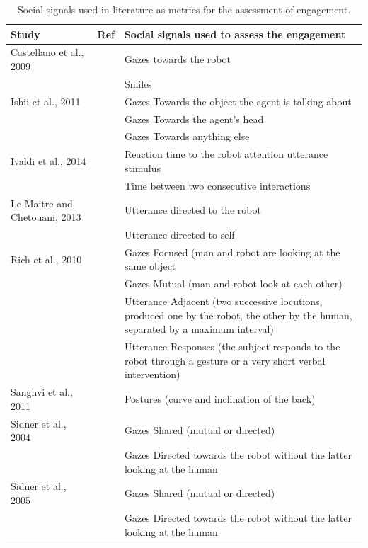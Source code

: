 \documentclass[twocolumn]{svjour3}          %
\begin{document}
\begin{table}
\centering
\begin{tabular}{|p{4.5cm}p{0.7cm}p{11cm}|}
\hline
Study & Ref & Social signals used to assess the engagement \\
\hline
\hline
Castellano et al., 2009 & \cite{Castellano2009} & Gazes towards the robot\\
 				& & Smiles\\
\hline
Ishii et al., 2011 & \cite{Iishi2011} &Gazes Towards the object the agent is talking about \\
			& &Gazes Towards the agent's head \\
			& &Gazes Towards anything else \\
\hline
Ivaldi et al., 2014 & \cite{ivaldi2014frontiers}  &Reaction time to the robot attention utterance stimulus \\
												& &Time between two consecutive interactions\\
\hline
Le Maitre and Chetouani, 2013 & \cite{Lemaitre2013} &Utterance directed to the robot \\
						& &Utterance  directed to self \\
\hline
Rich et al., 2010	& \cite{rich2010recognizing} &Gazes Focused (man and robot are looking at the same object \\
					& &Gazes Mutual (man and robot look at each other) \\
					& &Utterance Adjacent (two successive locutions, produced one by the robot, the other by the human, separated by a maximum interval) \\
					& &Utterance Responses (the subject responds to the robot through a gesture or a very short verbal intervention) \\
\hline
Sanghvi et al., 2011 & \cite{Sanghvi2011} & Postures (curve and inclination of the back) \\
\hline
Sidner et al., 2004 & \cite{sidner2004} &Gazes Shared (mutual or directed) \\
 			  & &Gazes Directed towards the robot without the latter looking at the human \\
\hline
Sidner et al., 2005 &  \cite{sidner2005} &Gazes Shared (mutual or directed) \\
 			  & &Gazes Directed towards the robot without the latter looking at the human \\
\hline
\end{tabular}
\caption{Social signals used in literature as metrics for the assessment of engagement.}
\label{table:literature}
\end{table}
\end{document}
